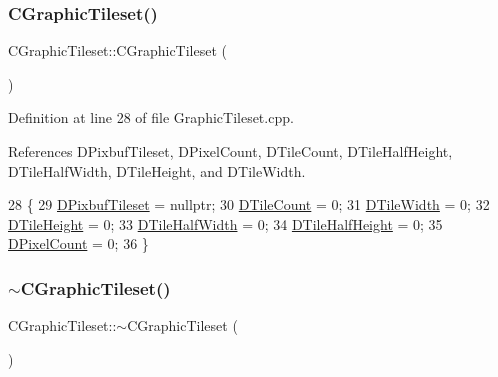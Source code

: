 \subsubsection{\texorpdfstring{C\+Graphic\+Tileset()}{CGraphicTileset()}}
{\footnotesize\ttfamily C\+Graphic\+Tileset\+::\+C\+Graphic\+Tileset (\begin{DoxyParamCaption}{ }\end{DoxyParamCaption})}



Definition at line 28 of file Graphic\+Tileset.\+cpp.



References D\+Pixbuf\+Tileset, D\+Pixel\+Count, D\+Tile\+Count, D\+Tile\+Half\+Height, D\+Tile\+Half\+Width, D\+Tile\+Height, and D\+Tile\+Width.


\begin{DoxyCode}
28                                 \{
29     \hyperlink{classCGraphicTileset_a5d5adfcdbb347a6df3f57535ca08e3ef}{DPixbufTileset} = \textcolor{keyword}{nullptr};
30     \hyperlink{classCGraphicTileset_a39d942b370e47f441bf97385eb1037c8}{DTileCount} = 0;
31     \hyperlink{classCGraphicTileset_a2d0c7d19865b81911a3a43d5cae50e00}{DTileWidth} = 0;
32     \hyperlink{classCGraphicTileset_af48f32e07d5fe69afd5f764318cc3244}{DTileHeight} = 0;
33     \hyperlink{classCGraphicTileset_a3e82808009078ce29f6b74bcd077b251}{DTileHalfWidth} = 0;
34     \hyperlink{classCGraphicTileset_a16c8bc4e4c8738fe561b0408cd40ccef}{DTileHalfHeight} = 0;
35     \hyperlink{classCGraphicTileset_a55fc9ceb1c92383c124e61c911fe57db}{DPixelCount} = 0;
36 \}
\end{DoxyCode}
\hypertarget{classCGraphicTileset_ab80f78214ec2ec7da8eef15e8e0f523d}{}\label{classCGraphicTileset_ab80f78214ec2ec7da8eef15e8e0f523d} 
\subsubsection{\texorpdfstring{$\sim$\+C\+Graphic\+Tileset()}{~CGraphicTileset()}}
{\footnotesize\ttfamily C\+Graphic\+Tileset\+::$\sim$\+C\+Graphic\+Tileset (\begin{DoxyParamCaption}{ }\end{DoxyParamCaption})\hspace{0.3cm}{\ttfamily [virtual]}}




